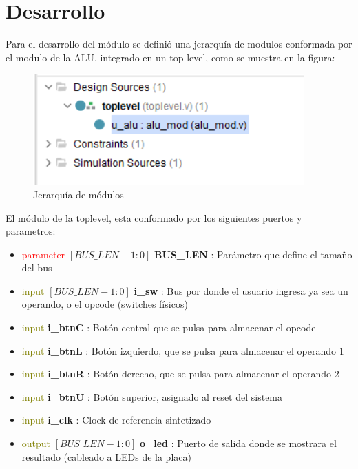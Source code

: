 \documentclass[paper=letter, fontsize=12pt]{article}
\begin{document}
\section{\textbf{Desarrollo}} \label{desarrollo_secc}

Para el desarrollo del módulo se definió una jerarquía de modulos conformada por el modulo de la ALU, integrado en un top level, como se muestra en la figura:

\begin{figure}[H]
\centering
\includegraphics[scale=0.9, width=.6\textwidth]{modules.png}
\caption{Jerarquía de módulos}
\end{figure}

El módulo de la toplevel, esta conformado por los siguientes puertos y parametros:

\begin{itemize}
\item \textcolor{red}{parameter} $[BUS\_LEN -1 : 0]$ \textbf{BUS\_LEN}  : Parámetro que define el tamaño del bus 
\item \textcolor{olive}{input} $[BUS\_LEN -1 : 0]$ \textbf{i\_sw}  : Bus por donde el usuario ingresa ya sea un operando, o el opcode (switches físicos)
\item \textcolor{olive}{input} \textbf{i\_btnC} : Botón central que se pulsa para almacenar el opcode
\item \textcolor{olive}{input} \textbf{i\_btnL} : Botón izquierdo, que se pulsa para almacenar el operando 1 
\item \textcolor{olive}{input} \textbf{i\_btnR} : Botón derecho, que se pulsa para almacenar el operando 2
\item \textcolor{olive}{input} \textbf{i\_btnU} : Botón superior, asignado al reset del sistema
\item \textcolor{olive}{input}  \textbf{i\_clk}    : Clock de referencia sintetizado
\item \textcolor{olive}{output} $[BUS\_LEN -1 : 0 ]$ \textbf{o\_led} : Puerto de salida donde se mostrara el resultado (cableado a LEDs de la placa)

\end{itemize}
\end{document}
